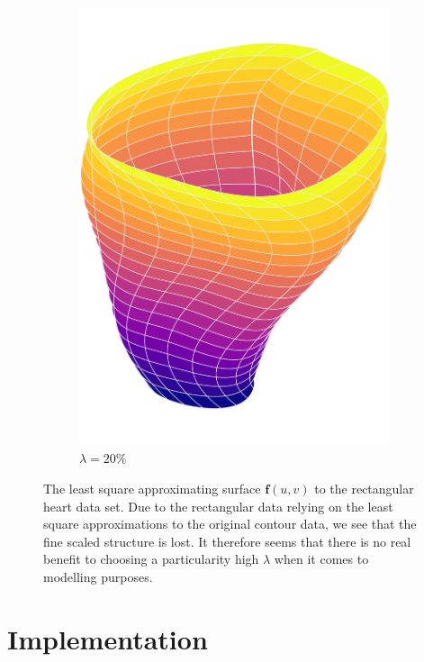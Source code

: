 \documentclass[article]{memoir}
\newcommand{\f}{\mathbf{f}}
\begin{document}
\begin{figure}[htbp]
\begin{subfigure}{0.32\textwidth}
        \includegraphics[width=\linewidth]{../images/surfaces_lambda_20_cropped.pdf}
        \caption{\( \lambda = 20 \% \)}
    \end{subfigure}
    \caption{The least square approximating surface \( \f(u, v) \) to the rectangular heart
        data set. Due to the rectangular data relying on the least square
        approximations to the original contour data, we see that the fine
        scaled structure is lost. It therefore seems that there is no real
    benefit to choosing a particularity high \( \lambda \) when it comes to
    modelling purposes.}
    \label{fig:surfaces}
\end{figure}

\clearpage
\appendix
\chapter{Implementation}
\end{document}
